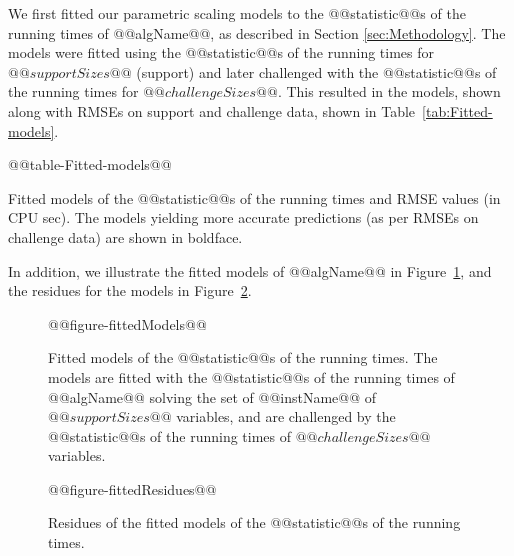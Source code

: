 \label{sec:Results}

We first fitted our parametric scaling models to the @@statistic@@s of the  running times
of @@algName@@, as described in Section \ref{sec:Methodology}. The
models were fitted using the @@statistic@@s of the  running times for $@@supportSizes@@$
(support) and later challenged with the @@statistic@@s of the  running times for $@@challengeSizes@@$.
This resulted in the models, shown along with RMSEs on support and
challenge data, shown in Table~\ref{tab:Fitted-models}.
\begin{table}[tb]
\begin{centering}
@@table-Fitted-models@@
% 
\par\end{centering}

\caption{\label{tab:Fitted-models}Fitted models of the @@statistic@@s of the  running times and RMSE
values (in CPU sec). The models yielding more
accurate predictions (as per RMSEs on challenge data) are shown in
boldface.}
\end{table}
In addition, we illustrate the fitted models of @@algName@@ in Figure~\ref{fig:Fitted-models},
and the residues for the models in Figure~\ref{fig:Fitted-residues}.
\begin{figure}[tb]
\noindent \begin{centering}
@@figure-fittedModels@@
\par\end{centering}

\caption{\label{fig:Fitted-models} Fitted models of the @@statistic@@s of the  running times. 
The models are fitted with the @@statistic@@s of the  running times of
@@algName@@ solving the set of @@instName@@ 
of $@@supportSizes@@$ variables, and are challenged by the @@statistic@@s of the 
running times of $@@challengeSizes@@$ variables.}
\end{figure}


\begin{figure}[tb]
\noindent \begin{centering}
@@figure-fittedResidues@@
\par\end{centering}

\caption{\label{fig:Fitted-residues} Residues of the fitted models of the @@statistic@@s of the  running times. }
\end{figure}


